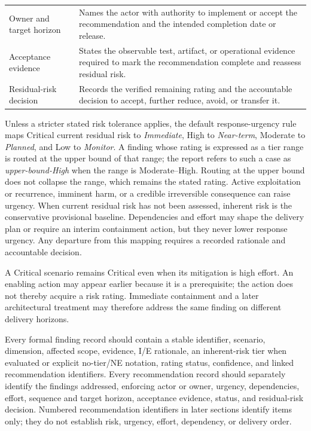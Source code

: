 \documentclass[../main.tex]{subfiles}
\begin{document}
\begin{longtable}{@{}>{\raggedright\arraybackslash}p{0.25\widetablewidth}p{0.68\widetablewidth}@{}}
Owner and target horizon &
Names the actor with authority to implement or accept the recommendation and
the intended completion date or release. \\

Acceptance evidence &
States the observable test, artifact, or operational evidence required to mark
the recommendation complete and reassess residual risk. \\

Residual-risk decision &
Records the verified remaining rating and the accountable decision to accept,
further reduce, avoid, or transfer it. \\

\end{longtable}
\endgroup

Unless a stricter stated risk tolerance applies, the default response-urgency
rule maps Critical current residual risk to \emph{Immediate}, High to
\emph{Near-term}, Moderate to \emph{Planned}, and Low to
\emph{Monitor}. A finding whose rating is expressed as a tier range is routed
at the upper bound of that range; the report refers to such a case as
\emph{upper-bound-High} when the range is Moderate--High. Routing at the upper
bound does not collapse the range, which remains the stated rating. Active exploitation or recurrence, imminent harm, or a
credible irreversible consequence can raise urgency. When current residual risk
has not been assessed, inherent risk is the conservative provisional baseline.
Dependencies and effort may shape the delivery plan or require an interim
containment action, but they never lower response urgency. Any departure from
this mapping requires a recorded rationale and accountable decision.

A Critical scenario remains Critical even when its mitigation is high effort.
An enabling action may appear earlier because it is a prerequisite; the action
does not thereby acquire a risk rating. Immediate containment and a later
architectural treatment may therefore address the same finding on different
delivery horizons.

Every formal finding record should contain a stable identifier, scenario,
dimension, affected scope, evidence, I/E rationale, an inherent-risk tier when
evaluated or explicit no-tier/NE notation, rating status, confidence, and linked
recommendation identifiers. Every recommendation
record should separately identify the findings addressed, enforcing actor or
owner, urgency, dependencies, effort, sequence and target horizon, acceptance
evidence, status, and residual-risk decision. Numbered recommendation
identifiers in later sections identify items only; they do not establish risk,
urgency, effort, dependency, or delivery order.
\end{document}
